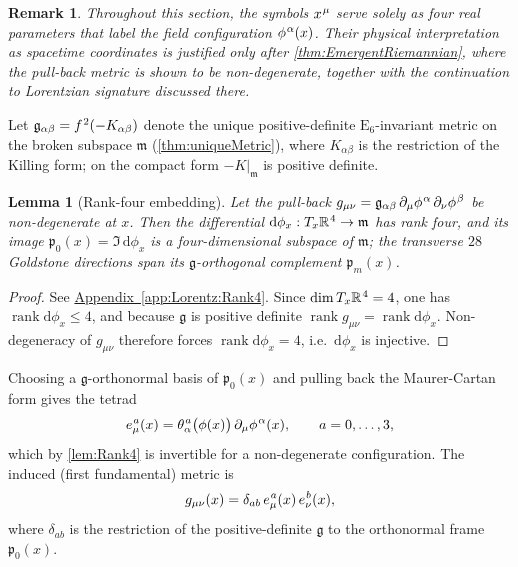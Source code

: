 \documentclass[pdflatex,sn-mathphys-num]{sn-jnl}
\theoremstyle{thmstyleone}
\newtheorem{lemma}[lemma]{Lemma}
\theoremstyle{thmstyletwo}%
\newtheorem{remark}{Remark}%
\theoremstyle{thmstylethree}%
\newcommand{\E}[1]{\mathrm{E_{#1}}}
\newcommand{\ESix}{\E{6}}
\newcommand{\sm}{\hspace{.065em}}
\newcommand{\appref}[1]{\hyperref[#1]{Appendix~\ref*{#1}}}
\newcommand{\smexp}[1]{^{\sm #1}}
\begin{document}
\begin{remark}
Throughout this section, the symbols $x\smexp{\mu}$ serve solely as four real parameters that label the field configuration $\phi\smexp{\alpha}(x)$. Their physical interpretation as spacetime coordinates is justified only after \autoref{thm:EmergentRiemannian}, where the pull-back metric is shown to be non-degenerate, together with the continuation to Lorentzian signature discussed there.
\end{remark}

Let $\mathfrak g_{\alpha\beta}=f\smexp{2}(-K_{\alpha\beta})$ denote the unique
positive-definite $\ESix$-invariant metric on the broken subspace $\mathfrak m$
(\autoref{thm:uniqueMetric}), where $K_{\alpha\beta}$ is the restriction of the
Killing form; on the compact form $-K|_{\mathfrak m}$ is positive definite.

\begin{lemma}[Rank-four embedding]\label{lem:Rank4}
Let the pull-back
$g_{\mu\nu}=\mathfrak g_{\alpha\beta}\,\partial_\mu\phi\smexp{\alpha}\,\partial_\nu\phi\smexp{\beta}$
be non-degenerate at $x$. Then the differential
$\mathrm d\phi_{x}:T_{x}\mathbb R\smexp{4}\to\mathfrak m$ has rank four, and its
image $\mathfrak p_{0}(x)=\Im\,\mathrm d\phi_{x}$ is a four-dimensional
subspace of $\mathfrak m$; the transverse $28$ Goldstone directions span its
$\mathfrak g$-orthogonal complement $\mathfrak p_{m}(x)$.
\end{lemma}

\begin{proof}
See \appref{app:Lorentz:Rank4}. Since $\dim T_{x}\mathbb R\smexp{4}=4$, one has
$\operatorname{rank}\mathrm d\phi_{x}\le4$, and because $\mathfrak g$ is
positive definite $\operatorname{rank} g_{\mu\nu}=\operatorname{rank}\mathrm
d\phi_{x}$. Non-degeneracy of $g_{\mu\nu}$ therefore forces
$\operatorname{rank}\mathrm d\phi_{x}=4$, i.e.\ $\mathrm d\phi_{x}$ is injective.
\end{proof}

Choosing a $\mathfrak g$-orthonormal basis of $\mathfrak p_{0}(x)$ and pulling
back the Maurer-Cartan form gives the tetrad
\begin{equation}\label{eq:eDef}
  e_\mu\smexp{ a}(x)=
  \theta\smexp{ a}_{\alpha}\bigl(\phi(x)\bigr)\,
  \partial_\mu\phi\smexp{ \alpha}(x),
  \qquad a=0,\dots,3,
\end{equation}
which by \autoref{lem:Rank4} is invertible for a non-degenerate configuration.
The induced (first fundamental) metric is
\begin{equation}\label{eq:InducedMetric}
  g_{\mu\nu}(x)
  =\delta_{ab}\,e_\mu\smexp{ a}(x)\,e_\nu\smexp{ b}(x),
\end{equation}
where $\delta_{ab}$ is the restriction of the positive-definite $\mathfrak g$ to
the orthonormal frame $\mathfrak p_{0}(x)$.
\end{document}
